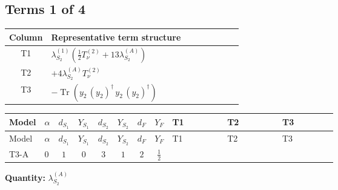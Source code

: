 \documentclass[8pt]{article}
\begin{document}
\begin{landscape}
\subsection*{Terms 1 of 4}
\begin{center}
\begin{tabular}{@{}c >{\raggedright\arraybackslash}p{0.82\linewidth}@{}}
\toprule
Column & Representative term structure \\
\midrule
T1 & \(\displaystyle {\lambda_{S_2}^{(1)}} \left(\frac{1}{2} T_{\nu}^{(2)}+13 {\lambda_{S_2}^{(A)}}\right)\) \\
\midrule
T2 & \(\displaystyle +4 {\lambda_{S_2}^{(A)}} T_{\nu}^{(2)}\) \\
\midrule
T3 & \(\displaystyle -\operatorname{Tr}\!\left({y_2}\,\left({y_2}\right)^{\dagger}\,{y_2}\,\left({y_2}\right)^{\dagger}\right)\) \\
\midrule
\bottomrule
\end{tabular}
\end{center}
\smallskip
\tiny
\begin{longtable}{@{}llcccccc >{\raggedright\arraybackslash}p{0.21\linewidth} >{\raggedright\arraybackslash}p{0.21\linewidth} >{\raggedright\arraybackslash}p{0.21\linewidth}@{}}
\toprule
Model & $\alpha$ & $d_{S_1}$ & $Y_{S_1}$ & $d_{S_2}$ & $Y_{S_2}$ & $d_F$ & $Y_F$ & T1 & T2 & T3 \\
\midrule
\endfirsthead
\toprule
Model & $\alpha$ & $d_{S_1}$ & $Y_{S_1}$ & $d_{S_2}$ & $Y_{S_2}$ & $d_F$ & $Y_F$ & T1 & T2 & T3 \\
\midrule
\endhead
T3-A & $0$ & $1$ & $0$ & $3$ & $1$ & $2$ & $\frac{1}{2}$ & \scriptsize\adjustbox{max width=\linewidth}{$\begin{gathered} {\lambda_{S_2}^{(1)}} \left(\frac{1}{2} T_{\nu}^{(2)}+13 {\lambda_{S_2}^{(A)}}\right)\end{gathered}$} & \scriptsize\adjustbox{max width=\linewidth}{$\begin{gathered} +4 {\lambda_{S_2}^{(A)}} T_{\nu}^{(2)}\end{gathered}$} & \scriptsize\adjustbox{max width=\linewidth}{$\begin{gathered} -\operatorname{Tr}\!\left({y_2}\,\left({y_2}\right)^{\dagger}\,{y_2}\,\left({y_2}\right)^{\dagger}\right)\end{gathered}$} \\
\midrule
\bottomrule
\end{longtable}
\clearpage
\noindent\textbf{Quantity: }$\lambda_{S_2}^{(A)}$\par\smallskip

\end{landscape}
\end{document}
